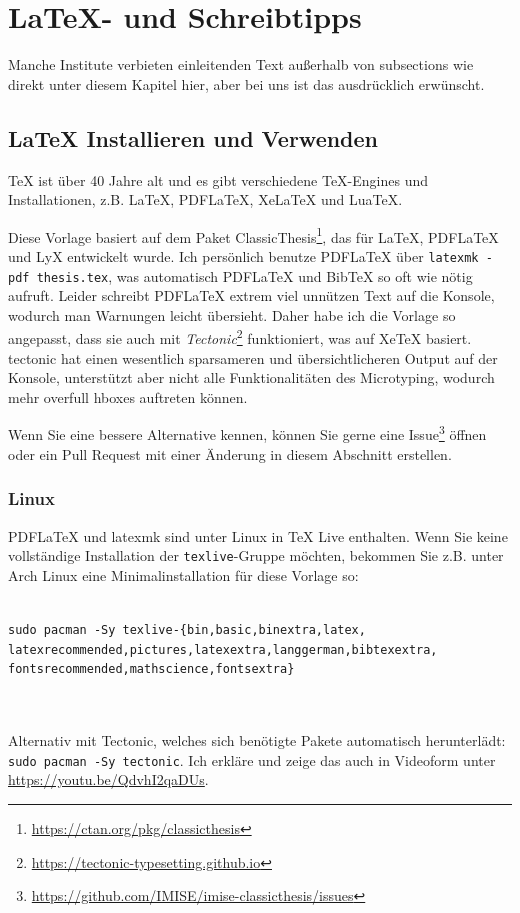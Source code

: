 \chapter{\LaTeX{}- und Schreibtipps}
Manche Institute verbieten einleitenden Text außerhalb von subsections wie direkt unter diesem Kapitel hier, aber bei uns ist das ausdrücklich erwünscht.

\section{\LaTeX{} Installieren und Verwenden}
\TeX{} ist über 40 Jahre alt und es gibt verschiedene \TeX{}-Engines und Installationen\footnotemark{}, z.B. \LaTeX{}, PDF\LaTeX{}, Xe\LaTeX{} und Lua\TeX{}.

Diese Vorlage basiert auf dem Paket ClassicThesis\footnote{\url{https://ctan.org/pkg/classicthesis}}, das für \LaTeX{}, PDF\LaTeX{} und LyX entwickelt wurde.
Ich persönlich benutze PDF\LaTeX{} über \texttt{latexmk -pdf thesis.tex}, was automatisch PDF\LaTeX{} und Bib\TeX{} so oft wie nötig aufruft.
Leider schreibt PDF\LaTeX{} extrem viel unnützen Text auf die Konsole, wodurch man Warnungen leicht übersieht.
Daher habe ich die Vorlage so angepasst, dass sie auch mit \emph{Tectonic}\footnote{\url{https://tectonic-typesetting.github.io}} funktioniert, was auf Xe\TeX{} basiert.
tectonic hat einen wesentlich sparsameren und übersichtlicheren Output auf der Konsole, unterstützt aber nicht alle Funktionalitäten des Microtyping, wodurch mehr overfull hboxes auftreten können.

Wenn Sie eine bessere Alternative kennen, können Sie gerne eine Issue\footnote{\url{https://github.com/IMISE/imise-classicthesis/issues}} öffnen oder ein Pull Request mit einer Änderung in diesem Abschnitt erstellen.

\subsection{Linux}

PDF\LaTeX{} und latexmk sind unter Linux in \TeX{} Live enthalten.
Wenn Sie keine vollständige Installation der \texttt{texlive}-Gruppe möchten, bekommen Sie z.B. unter Arch Linux eine Minimalinstallation für diese Vorlage so:\\
~\\
{\raggedright\texttt{sudo pacman -Sy texlive-\{bin,basic,binextra,latex,\\%
latexrecommended,pictures,latexextra,langgerman,bibtexextra,\\%
fontsrecommended,mathscience,fontsextra\}}}
~\\
~\\
Alternativ mit Tectonic, welches sich benötigte Pakete automatisch herunterlädt: \texttt{sudo pacman -Sy tectonic}.
Ich erkläre und zeige das auch in Videoform unter \url{https://youtu.be/QdvhI2qaDUs}.

